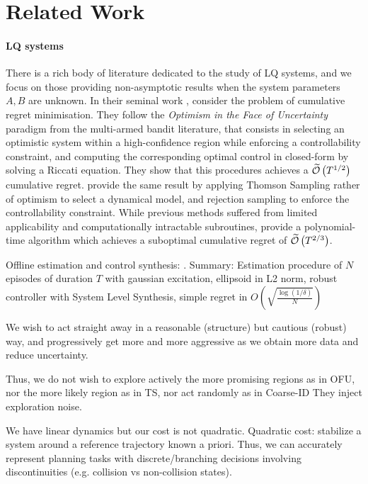 \documentclass{article}
\begin{document}
\section{Related Work}

\paragraph{LQ systems} There is a rich body of literature dedicated to the study of LQ systems, and we focus on those providing non-asymptotic results when the system parameters $A, B$ are unknown. In their seminal work \citet{abbasi-yadkori11a}, consider the problem of cumulative regret minimisation. They follow the \emph{Optimism in the Face of Uncertainty} paradigm from the multi-armed bandit literature, that consists in selecting an optimistic system within a high-confidence region while enforcing a controllability constraint, and computing the corresponding optimal control in closed-form by solving a Riccati equation. They show that this procedures achieves a $\widetilde{\mathcal{O}}\left(T^{1/2}\right)$ cumulative regret. \citet{abeille18a} provide the same result by applying Thomson Sampling rather of optimism to select a dynamical model, and rejection sampling to enforce the controllability constraint.
While previous methods suffered from limited applicability and computationally intractable subroutines, \citep{Dean2018} provide a polynomial-time algorithm which achieves a suboptimal cumulative regret of $\widetilde{\mathcal{O}}\left(T^{2/3}\right)$.


Offline estimation and control synthesis: \citep{Dean2017}. Summary: Estimation procedure of $N$ episodes of duration $T$ with gaussian excitation, ellipsoid in L2 norm, robust controller with System Level Synthesis, simple regret in $O(\sqrt{\frac{\log(1/\delta)}{N}})$



We wish to act straight away in a reasonable (structure) but cautious (robust) way, and progressively get more and more aggressive as we obtain more data and reduce uncertainty.
    
Thus, we do not wish to explore actively the more promising regions as in OFU, nor the more likely region as in TS, nor act randomly as in Coarse-ID They inject exploration noise.
    
We have linear dynamics but our cost is not quadratic. Quadratic cost: stabilize a system around a reference trajectory known a priori. Thus, we can accurately represent planning tasks with discrete/branching decisions involving discontinuities (e.g. collision vs non-collision states).
    
\end{document}
